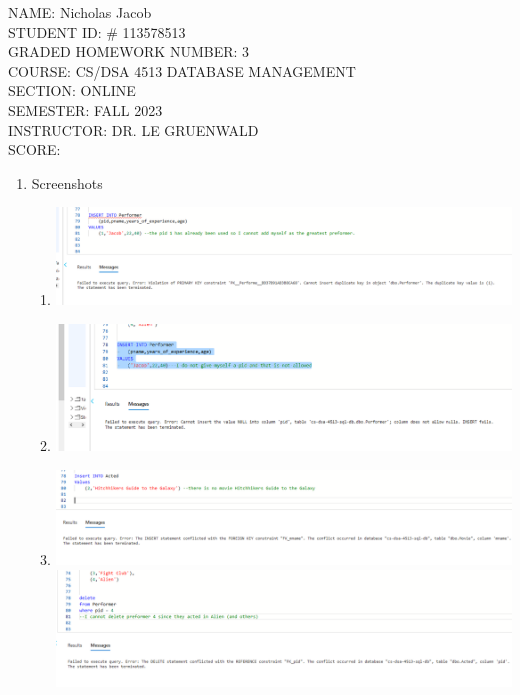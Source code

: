 \documentclass[11pt]{article}
\author{}
\title{}
\begin{document}
{\Large
\noindent NAME:  Nicholas Jacob\\ 
STUDENT ID: \# 113578513\\
GRADED HOMEWORK NUMBER: 3\\
COURSE: CS/DSA 4513 DATABASE MANAGEMENT\\ 
SECTION: ONLINE\\SEMESTER: FALL 2023\\
INSTRUCTOR:  DR. LE GRUENWALD\\
 SCORE:}

\newpage
\begin{enumerate} \item Screenshots
\begin{enumerate}
\item \includegraphics[width = \textwidth]{primaryKeyViolation.png} 
\item \includegraphics[width = \textwidth]{noKeyViolation.png} 
\item \includegraphics[width = \textwidth]{fKeyViolation.png} 
 \includegraphics[width = \textwidth]{fKeyViolationDelete.png} 

\end{enumerate}
\end{enumerate}
\end{document}
